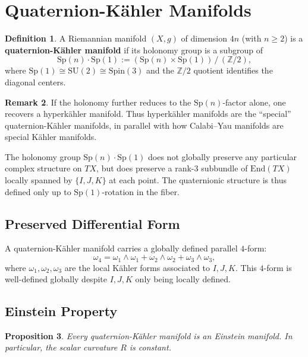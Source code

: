 \documentclass[12pt]{article}
\theoremstyle{definition}
\newtheorem{definition}{Definition}[section]
\newtheorem{remark}[definition]{Remark}
\theoremstyle{plain}
\newtheorem{proposition}[definition]{Proposition}
\newcommand{\Sp}{\mathrm{Sp}}
\newcommand{\SU}{\mathrm{SU}}
\newcommand{\Spin}{\mathrm{Spin}}
\begin{document}
\section{Quaternion-K\"{a}hler Manifolds}

\begin{definition}
A Riemannian manifold $(X, g)$ of dimension $4n$ (with $n \geq 2$) is a \textbf{quaternion-K\"{a}hler manifold} if its holonomy group is a subgroup of
\[
\Sp(n) \cdot \Sp(1) := (\Sp(n) \times \Sp(1))\,/\,(\mathbb{Z}/2),
\]
where $\Sp(1) \cong \SU(2) \cong \Spin(3)$ and the $\mathbb{Z}/2$ quotient identifies the diagonal centers.
\end{definition}

\begin{remark}
If the holonomy further reduces to the $\Sp(n)$-factor alone, one recovers a hyperk\"{a}hler manifold. Thus hyperk\"{a}hler manifolds are the ``special'' quaternion-K\"{a}hler manifolds, in parallel with how Calabi--Yau manifolds are special K\"{a}hler manifolds.
\end{remark}

The holonomy group $\Sp(n) \cdot \Sp(1)$ does not globally preserve any particular complex structure on $TX$, but does preserve a rank-3 subbundle of $\mathrm{End}(TX)$ locally spanned by $\{I, J, K\}$ at each point. The quaternionic structure is thus defined only up to $\Sp(1)$-rotation in the fiber.

\subsection{Preserved Differential Form}

A quaternion-K\"{a}hler manifold carries a globally defined parallel $4$-form:
\[
\omega_4 = \omega_1 \wedge \omega_1 + \omega_2 \wedge \omega_2 + \omega_3 \wedge \omega_3,
\]
where $\omega_1, \omega_2, \omega_3$ are the local K\"{a}hler forms associated to $I, J, K$. This $4$-form is well-defined globally despite $I, J, K$ only being locally defined.

\subsection{Einstein Property}

\begin{proposition}
Every quaternion-K\"{a}hler manifold is an Einstein manifold. In particular, the scalar curvature $R$ is constant.
\end{proposition}
\end{document}
